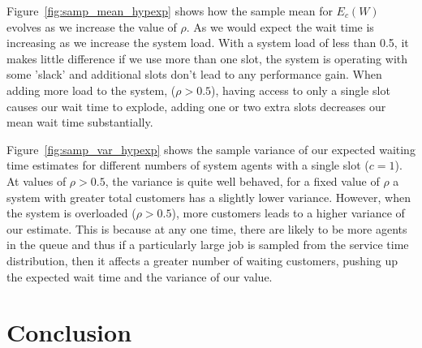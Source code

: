 \documentclass{article}
\begin{document}
    Figure~\ref{fig:samp_mean_hypexp} shows how the sample mean for $E_c(W)$ evolves as we increase the value of $\rho$. As we would expect the wait time is increasing as we increase the system load. With a system load of less than 0.5, it makes little difference if we use more than one slot, the system is operating with some 'slack' and additional slots don't lead to any performance gain. When adding more load to the system, ($\rho > 0.5$), having access to only a single slot causes our wait time to explode, adding one or two extra slots decreases our mean wait time substantially.

    Figure~\ref{fig:samp_var_hypexp} shows the sample variance of our expected waiting time estimates for different numbers of system agents with a single slot ($c = 1$). At values of $\rho > 0.5$, the variance is quite well behaved, for a fixed value of $\rho$ a system with greater total customers has a slightly lower variance. However, when the system is overloaded ($\rho > 0.5$), more customers leads to a higher variance of our estimate. This is because at any one time, there are likely to be more agents in the queue and thus if a particularly large job is sampled from the service time distribution, then it affects a greater number of waiting customers, pushing up the expected wait time and the variance of our value.

    \section*{Conclusion}
\end{document}
